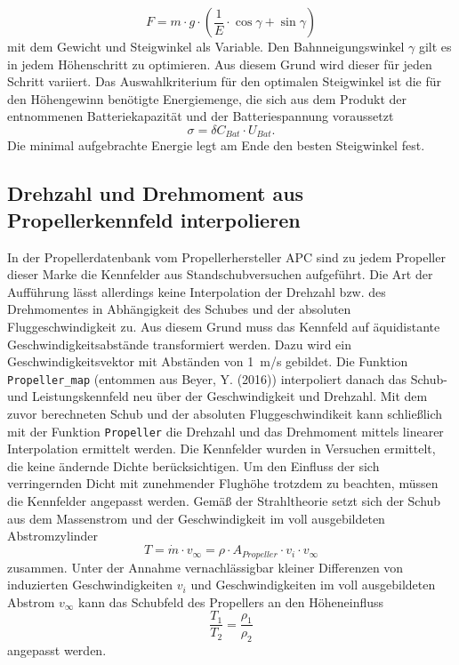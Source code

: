 \begin{equation}
	F = m\cdot g\cdot (\frac{1}{E}\cdot\cos\gamma + \sin\gamma) \label{eq:schub_flaechenflugzeug}
\end{equation}
mit dem Gewicht und Steigwinkel als Variable.
Den Bahnneigungswinkel \ensuremath{\gamma} gilt es in jedem Höhenschritt zu optimieren. Aus diesem Grund wird dieser für jeden Schritt variiert. Das Auswahlkriterium für den optimalen Steigwinkel ist die für den Höhengewinn benötigte Energiemenge, die sich aus dem Produkt der entnommenen Batteriekapazität und der Batteriespannung voraussetzt
\begin{equation}
	\sigma = \delta C_{Bat}\cdot U_{Bat}.
\end{equation}
Die minimal aufgebrachte Energie legt am Ende den besten Steigwinkel fest.


\subsection{Drehzahl und Drehmoment aus Propellerkennfeld interpolieren}
In der Propellerdatenbank vom Propellerhersteller APC sind zu jedem Propeller dieser Marke die Kennfelder aus Standschubversuchen aufgeführt. Die Art der Aufführung lässt allerdings keine Interpolation der Drehzahl bzw. des Drehmomentes in Abhängigkeit des Schubes und der absoluten Fluggeschwindigkeit zu. Aus diesem Grund muss das Kennfeld auf äquidistante Geschwindigkeitsabstände transformiert werden. Dazu wird ein Geschwindigkeitsvektor mit Abständen von \SI{1}{m/s} gebildet. Die Funktion \texttt{Propeller\_map} (entommen aus Beyer, Y. (2016)) interpoliert danach das Schub- und Leistungskennfeld neu über der Geschwindigkeit und Drehzahl. Mit dem zuvor berechneten Schub und der absoluten Fluggeschwindikeit kann schließlich mit der Funktion \texttt{Propeller} die Drehzahl und das Drehmoment mittels linearer Interpolation ermittelt werden.
Die Kennfelder wurden in Versuchen ermittelt, die keine ändernde Dichte berücksichtigen. Um den Einfluss der sich verringernden Dicht mit zunehmender Flughöhe trotzdem zu beachten, müssen die Kennfelder angepasst werden. Gemäß der Strahltheorie setzt sich der Schub aus dem Massenstrom und der Geschwindigkeit im voll ausgebildeten Abstromzylinder 
\begin{equation}
	T =  \dot{m}\cdot v_{\infty} = \rho\cdot A_{Propeller}\cdot v_i\cdot v_{\infty}
\end{equation}
zusammen. Unter der Annahme vernachlässigbar kleiner Differenzen von  induzierten Geschwindigkeiten $v_i$ und Geschwindigkeiten im voll ausgebildeten Abstrom $v_{\infty}$ kann das Schubfeld des Propellers an den Höheneinfluss 
\begin{equation}
	\frac{T_1}{T_2} = \frac{\rho_1}{\rho_2}
\end{equation}
angepasst werden.


